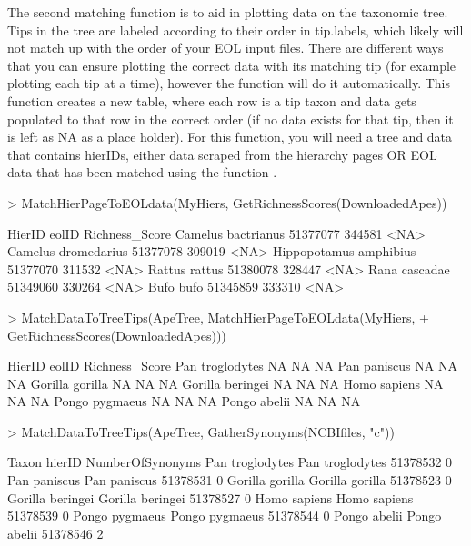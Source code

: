\documentclass[12pt]{article}
\begin{document}
The second matching function is to aid in plotting data on the taxonomic tree.  Tips in the tree are labeled according to their order in tip.labels, which likely will not match up with the order of your EOL input files.  There are different ways that you can ensure plotting the correct data with its matching tip (for example plotting each tip at a time), however the function  will do it automatically.  This function creates a new table, where each row is a tip taxon and data gets populated to that row in the correct order (if no data exists for that tip, then it is left as NA as a place holder).  For this function, you will need a tree and data that contains hierIDs, either data scraped from the hierarchy pages OR EOL data that has been matched using the function .  

\begin{Schunk}
\begin{Sinput}
> MatchHierPageToEOLdata(MyHiers, GetRichnessScores(DownloadedApes))
\end{Sinput}
\begin{Soutput}
                         HierID  eolID Richness_Score
Camelus bactrianus     51377077 344581           <NA>
Camelus dromedarius    51377078 309019           <NA>
Hippopotamus amphibius 51377070 311532           <NA>
Rattus rattus          51380078 328447           <NA>
Rana cascadae          51349060 330264           <NA>
Bufo bufo              51345859 333310           <NA>
\end{Soutput}
\begin{Sinput}
> MatchDataToTreeTips(ApeTree, MatchHierPageToEOLdata(MyHiers, 
+      GetRichnessScores(DownloadedApes)))
\end{Sinput}
\begin{Soutput}
                 HierID eolID Richness_Score
Pan troglodytes      NA    NA             NA
Pan paniscus         NA    NA             NA
Gorilla gorilla      NA    NA             NA
Gorilla beringei     NA    NA             NA
Homo sapiens         NA    NA             NA
Pongo pygmaeus       NA    NA             NA
Pongo abelii         NA    NA             NA
\end{Soutput}
\begin{Sinput}
> MatchDataToTreeTips(ApeTree, GatherSynonyms(NCBIfiles, "c"))
\end{Sinput}
\begin{Soutput}
                            Taxon   hierID NumberOfSynonyms
Pan troglodytes   Pan troglodytes 51378532                0
Pan paniscus         Pan paniscus 51378531                0
Gorilla gorilla   Gorilla gorilla 51378523                0
Gorilla beringei Gorilla beringei 51378527                0
Homo sapiens         Homo sapiens 51378539                0
Pongo pygmaeus     Pongo pygmaeus 51378544                0
Pongo abelii         Pongo abelii 51378546                2
\end{Soutput}
\end{Schunk}
\end{document}
